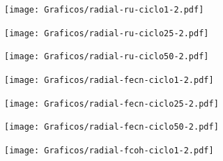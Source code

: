 			\begin{figure}[t!]
			   	    \begin{subfigure}[t]{0.325\textwidth}
			        	\texttt{[image: Graficos/radial-ru-ciclo1-2.pdf]}
			     		\end{subfigure}
			   	    \begin{subfigure}[t]{0.325\textwidth}
			        	\texttt{[image: Graficos/radial-ru-ciclo25-2.pdf]}
			     		\end{subfigure}
		     		\begin{subfigure}[t]{0.325\textwidth}
			        	\texttt{[image: Graficos/radial-ru-ciclo50-2.pdf]}
			     		\end{subfigure}
		     		\begin{subfigure}[t]{0.325\textwidth}
			        	\texttt{[image: Graficos/radial-fecn-ciclo1-2.pdf]}
			     		\end{subfigure}
		 	   	   	\begin{subfigure}[t]{0.325\textwidth}
			        	\texttt{[image: Graficos/radial-fecn-ciclo25-2.pdf]}
			     		\end{subfigure}
		     		\begin{subfigure}[t]{0.325\textwidth}
			        	\texttt{[image: Graficos/radial-fecn-ciclo50-2.pdf]}
			     		\end{subfigure}
			     	\begin{subfigure}[t]{0.325\textwidth}
			        	\texttt{[image: Graficos/radial-fcoh-ciclo1-2.pdf]}

\end{subfigure}
\end{figure}
